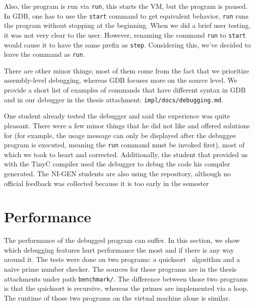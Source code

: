Also, the program is run via \texttt{run}, this starts the VM, but the program
is paused. In GDB, one has to use the \texttt{start} command to get equivalent
behavior, \texttt{run} runs the program without stopping at the beginning. When
we did a brief user testing, it was not very clear to the user. However,
renaming the command \texttt{run} to \texttt{start} would cause it to have the
same prefix as \texttt{step}. Considering this, we've decided to leave the
command as \texttt{run}.

There are other minor things; most of them come from the fact that we
prioritize assembly-level debugging, whereas GDB focuses more on the source
level. We provide a short list of examples of commands that have different
syntax in GDB and in our debugger in the thesis attachment:
\texttt{impl/docs/debugging.md}.

One student already tested the debugger and said the experience was quite
pleasant. There were a few minor things that he did not like and offered
solutions for (for example, the usage message can only be displayed after the
debuggee program is executed, meaning the \texttt{run} command must be invoked
first), most of which we took to heart and corrected. Additionally, the student
that provided us with the TinyC compiler used the debugger to debug the code
his compiler generated. The NI-GEN students are also using the repository,
although no official feedback was collected because it is too early in the
semester

\section{Performance}\label{section:benchmark}
The performance of the debugged program can suffer. In this section, we show
which debugging features hurt performance the most and if there is any way
around it. The tests were done on two programs: a quicksort~\cite{quicksort}
algorithm and a naive prime number checker. The sources for these programs are
in the thesis attachments under path \texttt{benchmark/}. The difference
between those two programs is that the quicksort is recursive, whereas the
primes are implemented via a loop. The runtime of those two programs on the
virtual machine alone is similar.

